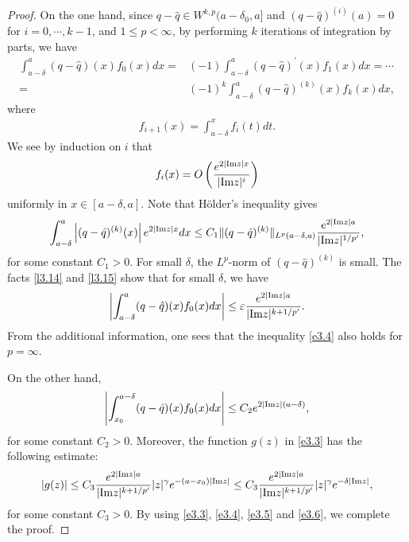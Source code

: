 \documentclass[reqno,12pt,centertags]{amsart}
\numberwithin{equation}{section}
\theoremstyle{definition}
\begin{document}
\begin{proof}
On the one hand, 
since $q-\hat{q}\in W^{k, p}(a-\delta_0, a]$ and $(q-\hat{q})^{(i)}(a)=0$ for $i=0, \cdots, k-1$, and $1\leq p<\infty$, 
by performing $k$ iterations of integration by parts, we have 
\begin{equation*}
\begin{split}
\int_{a-\delta}^a(q-\hat{q})(x)f_{0}(x)dx=&(-1)\int_{a-\delta}^a(q-\hat{q})^{\prime}(x)f_{1}(x)dx=\cdots\\
=&(-1)^{k}\int_{a-\delta}^a(q-\hat{q})^{(k)}(x)f_{k}(x)dx,
\end{split}
\end{equation*}
where 
\begin{align*}
f_{i+1}(x)=\int_{a-\delta}^{x} f_i(t)dt.
\end{align*}
We see by induction on $i$ that
\begin{equation}\label{l3.14}
f_i(x)
=O\left(\frac{e^{2|\textnormal{Im}z|x}}
{|\textnormal{Im}z|^{i}}\right)
\end{equation}
uniformly in $x\in[a-\delta,a]$. Note that H\"{o}lder's inequality gives 
\begin{equation}\label{l3.15}
\int_{a-\delta}^{a}
\left|(q-\hat{q})^{(k)}(x)\right|e^{2|\textnormal{Im}z|x}dx \leq C_1\|(q-\hat{q})^{(k)}\|_{L^{p}(a-\delta, a)}
\frac{e^{2|\textnormal{Im}z|a}}{|\textnormal{Im}z|^{1/p^{\prime}}},
\end{equation}
for some constant $C_1>0$. For small $\delta$, the $L^{p}$-norm of $(q-\hat{q})^{(k)}$ is small. 
The facts \eqref{l3.14} and \eqref{l3.15} show that for small $\delta$, we have 
\begin{equation}\label{e3.4}
\left|\int_{a-\delta}^{a}(q-\hat{q})(x)f_{0}(x)dx\right| 
\leq \varepsilon \frac{e^{2|\textnormal{Im}z|a}}{|\textnormal{Im}z|^{k+1/p^{\prime}}}.
\end{equation}
From the additional information, one sees that the inequality \eqref{e3.4} also holds for $p=\infty$.


On the other hand, 
\begin{equation}\label{e3.5}
\left|\int_{x_0}^{a-\delta}(q-\hat{q})(x)f_{0}(x)dx\right| 
\leq C_{2}e^{2|\textnormal{Im}z|(a-\delta)},
\end{equation}
for some constant $C_2>0$. Moreover, the function $g(z)$ in \eqref{e3.3} has the following estimate:
\begin{equation}\label{e3.6}
 |g(z)|
\leq C_{3}
\frac{e^{2|\textnormal{Im}z| a}}{|\textnormal{Im}z|^{k+1/p^{\prime}}} |z|^{\gamma}e^{-(a-x_0)|\textnormal{Im}z|}
\leq C_{3} 
\frac{e^{2|\textnormal{Im}z|a}}{|\textnormal{Im}z|^{k+1/p^{\prime}}} |z|^{\gamma}e^{-\delta|\textnormal{Im}z|},
\end{equation}
for some constant $C_3>0$. By using \eqref{e3.3}, \eqref{e3.4}, \eqref{e3.5} and \eqref{e3.6}, we complete the proof.
\end{proof}
\end{document}
